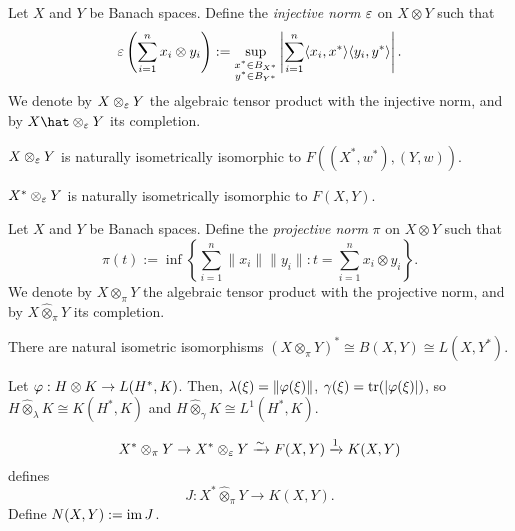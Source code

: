 \documentclass{../../large}
\begin{document}
\begin{prb}

\end{prb}

\begin{prb}
Let $X$ and $Y$ be Banach spaces.
Define the \emph{injective norm} $\varepsilon$ on $X\otimes Y$ such that
\[\varepsilon\left(\sum_{i=1}^nx_i\otimes y_i\right):=\sup_{\substack{x^*\in B_{X^*}\\y^*\in B_{Y^*}}}\left|\sum_{i=1}^n\langle x_i,x^*\rangle\langle y_i,y^*\rangle\right|.\]
We denote by $X\otimes_\varepsilon Y$ the algebraic tensor product with the injective norm, and by $X\hat\otimes_\e Y$ its completion.
\begin{parts}
\item $X\otimes_\varepsilon Y$ is naturally isometrically isomorphic to $F((X^*,w^*),(Y,w))$.
\item $X^*\otimes_\varepsilon Y$ is naturally isometrically isomorphic to $F(X,Y)$.
\end{parts}
\end{prb}

\begin{prb}
Let $X$ and $Y$ be Banach spaces.
Define the \emph{projective norm} $\pi$ on $X\otimes Y$ such that
\[\pi\left(t\right):=\inf\left\{\sum_{i=1}^n\|x_i\|\|y_i\|:t=\sum_{i=1}^nx_i\otimes y_i\right\}.\]
We denote by $X\otimes_\pi Y$ the algebraic tensor product with the projective norm, and by $X\hat\otimes_\pi Y$ its completion.
\begin{parts}
\item There are natural isometric isomorphisms $(X\otimes_\pi Y)^*\cong B(X,Y)\cong L(X,Y^*)$.
\item
\end{parts}
\end{prb}

\begin{prb}

Let $\varphi:H\otimes K\to L(H^*,K)$.
Then, $\lambda(\xi)=\|\varphi(\xi)\|$, $\gamma(\xi)=\operatorname{tr}(|\varphi(\xi)|)$, so $H\hat\otimes_\lambda K\cong K(H^*,K)$ and $H\hat\otimes_\gamma K\cong L^1(H^*,K)$.
\end{prb}


\begin{prb}
\[X^*\otimes_\pi Y\to X^*\otimes_\varepsilon Y\xrightarrow{\sim} F(X,Y)\xrightarrow{1}K(X,Y)\]
defines
\[J:X^*\hat\otimes_\pi Y\to K(X,Y).\]
Define $N(X,Y):=\operatorname{im} J$.
\end{prb}
\end{document}
